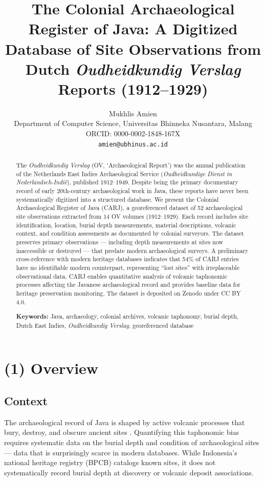 \documentclass[11pt]{article}
\title{The Colonial Archaeological Register of Java: A Digitized Database of Site Observations from Dutch \textit{Oudheidkundig Verslag} Reports (1912--1929)}
\author{Mukhlis Amien\\
\small Department of Computer Science, Universitas Bhinneka Nusantara, Malang\\
\small ORCID: 0000-0002-1848-167X\\
\small \texttt{amien@ubhinus.ac.id}}
\date{}
\begin{document}
\maketitle

\begin{abstract}
The \textit{Oudheidkundig Verslag} (OV, `Archaeological Report') was the annual publication of the Netherlands East Indies Archaeological Service (\textit{Oudheidkundige Dienst in Nederlandsch-Indi\"e}), published 1912--1949. Despite being the primary documentary record of early 20th-century archaeological work in Java, these reports have never been systematically digitized into a structured database. We present the Colonial Archaeological Register of Java (CARJ), a georeferenced dataset of 52 archaeological site observations extracted from 14 OV volumes (1912--1929). Each record includes site identification, location, burial depth measurements, material descriptions, volcanic context, and condition assessments as documented by colonial surveyors. The dataset preserves primary observations --- including depth measurements at sites now inaccessible or destroyed --- that predate modern archaeological surveys. A preliminary cross-reference with modern heritage databases indicates that 54\% of CARJ entries have no identifiable modern counterpart, representing ``lost sites'' with irreplaceable observational data. CARJ enables quantitative analysis of volcanic taphonomic processes affecting the Javanese archaeological record and provides baseline data for heritage preservation monitoring. The dataset is deposited on Zenodo under CC BY 4.0.

\noindent \textbf{Keywords:} Java, archaeology, colonial archives, volcanic taphonomy, burial depth, Dutch East Indies, \textit{Oudheidkundig Verslag}, georeferenced database
\end{abstract}

\section{(1) Overview}

\subsection{Context}

The archaeological record of Java is shaped by active volcanic processes that bury, destroy, and obscure ancient sites \citep{amien2026taphonomic}. Quantifying this taphonomic bias requires systematic data on the burial depth and condition of archaeological sites --- data that is surprisingly scarce in modern databases. While Indonesia's national heritage registry (BPCB) catalogs known sites, it does not systematically record burial depth at discovery or volcanic deposit associations.
\end{document}
